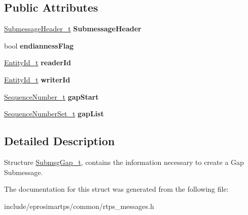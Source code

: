 \subsection*{\-Public \-Attributes}
\begin{DoxyCompactItemize}
\item 
\hypertarget{structeprosima_1_1rtps_1_1_submsg_gap__t_adec7d07a7b9a771c6d9f55f40ccab9c5}{\hyperlink{structeprosima_1_1rtps_1_1_submessage_header__t}{\-Submessage\-Header\-\_\-t} {\bfseries \-Submessage\-Header}}\label{structeprosima_1_1rtps_1_1_submsg_gap__t_adec7d07a7b9a771c6d9f55f40ccab9c5}

\item 
\hypertarget{structeprosima_1_1rtps_1_1_submsg_gap__t_a799594c812bc51c9485fd86f613f5076}{bool {\bfseries endianness\-Flag}}\label{structeprosima_1_1rtps_1_1_submsg_gap__t_a799594c812bc51c9485fd86f613f5076}

\item 
\hypertarget{structeprosima_1_1rtps_1_1_submsg_gap__t_a7d9f9af338e420f4ee91c201a76a4ebd}{\hyperlink{structeprosima_1_1rtps_1_1_entity_id__t}{\-Entity\-Id\-\_\-t} {\bfseries reader\-Id}}\label{structeprosima_1_1rtps_1_1_submsg_gap__t_a7d9f9af338e420f4ee91c201a76a4ebd}

\item 
\hypertarget{structeprosima_1_1rtps_1_1_submsg_gap__t_a8cc4c8dc5b692217c6dce354083dfd5f}{\hyperlink{structeprosima_1_1rtps_1_1_entity_id__t}{\-Entity\-Id\-\_\-t} {\bfseries writer\-Id}}\label{structeprosima_1_1rtps_1_1_submsg_gap__t_a8cc4c8dc5b692217c6dce354083dfd5f}

\item 
\hypertarget{structeprosima_1_1rtps_1_1_submsg_gap__t_adbdb8a9e06450a09d111cde921923473}{\hyperlink{structeprosima_1_1rtps_1_1_sequence_number__t}{\-Sequence\-Number\-\_\-t} {\bfseries gap\-Start}}\label{structeprosima_1_1rtps_1_1_submsg_gap__t_adbdb8a9e06450a09d111cde921923473}

\item 
\hypertarget{structeprosima_1_1rtps_1_1_submsg_gap__t_a0c8091d50b5d4a28ce82236f86cc1e00}{\hyperlink{structeprosima_1_1rtps_1_1_sequence_number_set__t}{\-Sequence\-Number\-Set\-\_\-t} {\bfseries gap\-List}}\label{structeprosima_1_1rtps_1_1_submsg_gap__t_a0c8091d50b5d4a28ce82236f86cc1e00}

\end{DoxyCompactItemize}


\subsection{\-Detailed \-Description}
\-Structure \hyperlink{structeprosima_1_1rtps_1_1_submsg_gap__t}{\-Submsg\-Gap\-\_\-t}, contains the information necessary to create a \-Gap \-Submessage. 

\-The documentation for this struct was generated from the following file\-:\begin{DoxyCompactItemize}
\item 
include/eprosimartps/common/rtps\-\_\-messages.\-h\end{DoxyCompactItemize}
